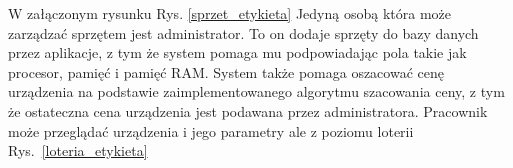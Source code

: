 W załączonym rysunku Rys. \ref{sprzet_etykieta} Jedyną osobą która może zarządzać sprzętem jest administrator. To on dodaje sprzęty do bazy danych przez aplikacje, z tym że system pomaga mu podpowiadając pola takie jak procesor, pamięć i pamięć RAM. System także pomaga oszacować cenę urządzenia na podstawie zaimplementowanego algorytmu szacowania ceny, z tym że ostateczna cena urządzenia jest podawana przez administratora. Pracownik może przeglądać urządzenia i jego parametry ale z poziomu loterii Rys.~\ref{loteria_etykieta}






